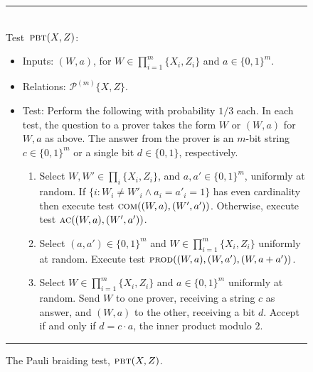 \documentclass[11pt]{article}
\numberwithin{equation}{section}
\theoremstyle{definition}
\theoremstyle{plain}
\newcommand{\pbt}{\textsc{pbt}}
\newcommand{\prodt}{\textsc{prod}}
\newcommand{\comt}{\textsc{com}}
\newcommand{\act}{\textsc{ac}}
\newcommand{\paulin}{\mathcal{P}^{(m)}\!}
\begin{document}
\begin{figure}[H]
\rule[1ex]{\textwidth}{0.5pt}\\
\justifying
Test~$\pbt(X,Z)$: \begin{itemize}
\item Inputs: $(W,a)$, for $W\in\prod_{i=1}^m\{X_i,Z_i\}$ and $a\in\{0,1\}^m$.
\item Relations: $\paulin\{X,Z\}$.  
\item Test: Perform the following with probability $1/3$ each. In each test, the question to a prover takes the form $W$ or $(W,a)$ for $W,a$ as above. The answer from the prover is an $m$-bit string $c\in\{0,1\}^m$ or a single bit $d\in\{0,1\}$, respectively.  %
\begin{enumerate}
\item[(a)] Select $W,W'\in \prod_i \{X_i,Z_i\}$, and $a,a'\in\{0,1\}^m$, uniformly at random. If $\{i: W_i\neq W'_i \wedge a_i=a'_i=1\}$ has even cardinality then execute test $\comt((W,a),(W',a'))$. Otherwise, execute test $\act((W,a),(W',a'))$. 
\item[(b)] Select $(a,a')\in\{0,1\}^m$ and $W\in\prod_{i=1}^m\{X_i,Z_i\}$ uniformly at random. Execute test $\prodt((W,a),(W,a'),(W,a+a'))$. 
\item[(c)] Select $W\in\prod_{i=1}^m\{X_i,Z_i\}$ and $a\in\{0,1\}^m$ uniformly at random. Send $W$ to one prover, receiving a string $c$ as answer, and $(W,a)$ to the other, receiving a bit $d$. Accept if and only if $d=c\cdot a$, the inner product modulo $2$.  
\end{enumerate}
\end{itemize}
\rule[2ex]{\textwidth}{0.5pt}\vspace{-.5cm}
\caption{The Pauli braiding test, $\pbt(X,Z)$.}
\label{fig:pbt}
\end{figure}
\end{document}
